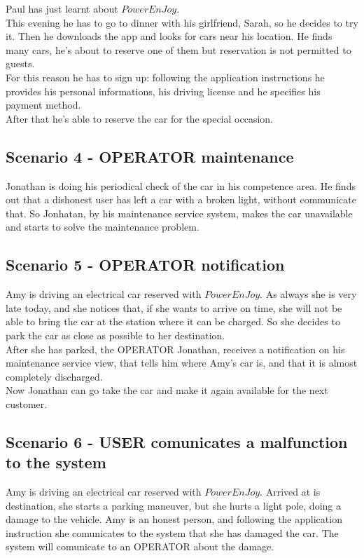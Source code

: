 Paul has just learnt about $\mathit{PowerEnJoy}$.\\
This evening he has to go to dinner with his girlfriend, Sarah, so
he decides to try it. Then he downloads the app and looks for cars
near his location. He finds many cars, he's about to reserve one of
them but reservation is not permitted to guests.\\
For this reason he has to sign up: following the application instructions
he provides his personal informations, his driving license and he
specifies his payment method.\\
After that he's able to reserve the car for the special occasion.

\subsection{Scenario 4 - OPERATOR maintenance}

Jonathan is doing his periodical check of the car in his competence
area. He finds out that a dishonest user has left a car with a broken
light, without communicate that. So Jonhatan, by his maintenance service
system, makes the car unavailable and starts to solve the maintenance
problem.

\subsection{Scenario 5 - OPERATOR notification}

Amy is driving an electrical car reserved with $\mathit{PowerEnJoy}$.
As always she is very late today, and she notices that, if she wants
to arrive on time, she will not be able to bring the car at the station
where it can be charged. So she decides to park the car as close as
possible to her destination. \\
After she has parked, the OPERATOR Jonathan, receives a notification
on his maintenance service view, that tells him where Amy's car is,
and that it is almost completely discharged.\\
Now Jonathan can go take the car and make it again available for the
next customer.

\subsection{Scenario 6 - USER comunicates a malfunction to the system}

Amy is driving an electrical car reserved with $\mathit{PowerEnJoy}$.
Arrived at is destination, she starts a parking maneuver, but she
hurts a light pole, doing a damage to the vehicle. Amy is an honest
person, and following the application instruction she comunicates
to the system that she has damaged the car. The system will comunicate
to an OPERATOR about the damage.

